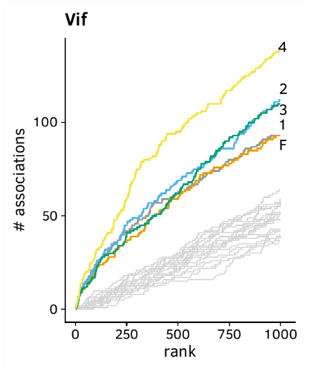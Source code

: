\documentclass[a4paper,11pt]{article}
\begin{document}
\begin{figure}[H]
    \begin{minipage}{.49\textwidth}
      \includegraphics[width=\linewidth]{plots/comparison_plots/hiv_brumme/vif_new_map.pdf}
    \end{minipage}
    \begin{minipage}{.49\textwidth}

\end{minipage}
\end{figure}
\end{document}
